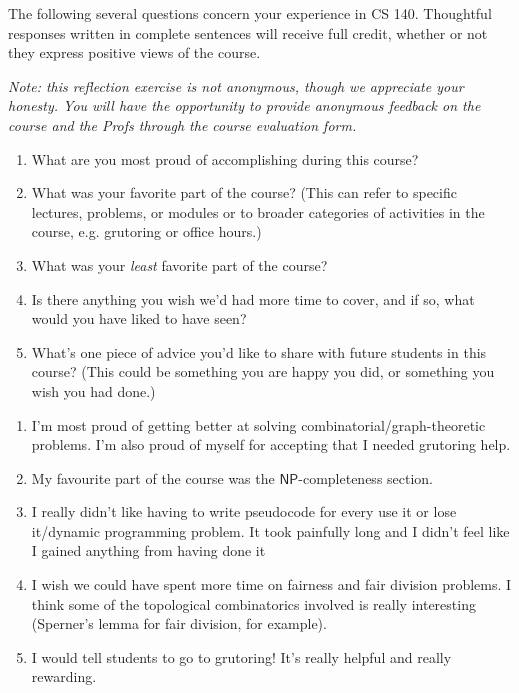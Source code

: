 \documentclass[12 pt, letterpaper]{hmcpset}
\begin{document}
\begin{problem}
The following several questions concern your experience in CS 140. Thoughtful responses written in complete sentences will receive full credit, whether or not they express positive views of the course. 

\emph{Note: this reflection exercise is not anonymous, though we appreciate your honesty. You will have the opportunity to provide anonymous feedback on the course and the Profs through the course evaluation form.}

\begin{enumerate}
    \item What are you most proud of accomplishing during this course?
    \item What was your favorite part of the course? (This can refer to specific lectures, problems, or modules or to broader categories of activities in the course, e.g. grutoring or office hours.)
    \item What was your \emph{least} favorite part of the course?
    \item Is there anything you wish we'd had more time to cover, and if so, what would you have liked to have seen?
    \item What's one piece of advice you'd like to share with future students in this course? (This could be something you are happy you did, or something you wish you had done.)
\end{enumerate}
\end{problem}

\begin{solution}
	\begin{enumerate}
		\item I'm most proud of getting better at solving combinatorial/graph-theoretic problems. I'm also proud of myself for accepting that I needed grutoring help.

		\item My favourite part of the course was the $\mathsf{NP}$-completeness section.

		\item I really didn't like having to write pseudocode for every use it or lose it/dynamic programming problem. It took painfully long and I didn't feel like I gained anything from having done it

		\item I wish we could have spent more time on fairness and fair division problems. I think some of the topological combinatorics involved is really interesting (Sperner's lemma for fair division, for example).

		\item I would tell students to go to grutoring! It's really helpful and really rewarding.
	\end{enumerate}
\end{solution}
\end{document}
